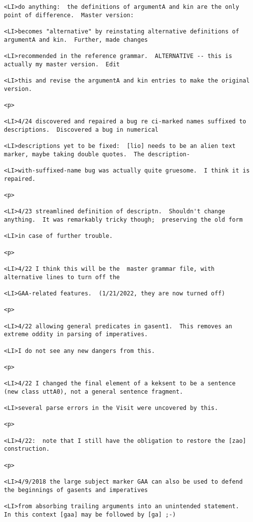 \documentclass[12pt]{article}
\begin{document}
\begin{lstlisting}
<LI>do anything:  the definitions of argumentA and kin are the only point of difference.  Master version:

<LI>becomes "alternative" by reinstating alternative definitions of argumentA and kin.  Further, made changes

<LI>recommended in the reference grammar.  ALTERNATIVE -- this is actually my master version.  Edit

<LI>this and revise the argumentA and kin entries to make the original version.

<p>

<LI>4/24 discovered and repaired a bug re ci-marked names suffixed to descriptions.  Discovered a bug in numerical

<LI>descriptions yet to be fixed:  [lio] needs to be an alien text marker, maybe taking double quotes.  The description-

<LI>with-suffixed-name bug was actually quite gruesome.  I think it is repaired.

<p>

<LI>4/23 streamlined definition of descriptn.  Shouldn't change anything.  It was remarkably tricky though;  preserving the old form

<LI>in case of further trouble.

<p>

<LI>4/22 I think this will be the  master grammar file, with alternative lines to turn off the

<LI>GAA-related features.  (1/21/2022, they are now turned off)

<p>

<LI>4/22 allowing general predicates in gasent1.  This removes an extreme oddity in parsing of imperatives.

<LI>I do not see any new dangers from this.

<p>

<LI>4/22 I changed the final element of a keksent to be a sentence (new class uttA0), not a general sentence fragment.

<LI>several parse errors in the Visit were uncovered by this.

<p>

<LI>4/22:  note that I still have the obligation to restore the [zao] construction.

<p>

<LI>4/9/2018 the large subject marker GAA can also be used to defend the beginnings of gasents and imperatives

<LI>from absorbing trailing arguments into an unintended statement.  In this context [gaa] may be followed by [ga] ;-)


\end{lstlisting}
\end{document}
